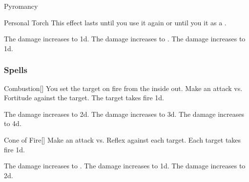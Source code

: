 \begin{spellsection}{Pyromancy}
\begin{freeability}{Personal Torch}
This effect lasts until you use it again or until you  it as a .

\rankline
{} The damage increases to  \minus1d.
 The damage increases to .
 The damage increases to  \plus1d.
\end{freeability}

\end{spellsection}


\subsubsection{Spells}


\lowercase{\hypertarget{spell:Combustion}{}}\label{spell:Combustion}
\begin{freeability}[Rank 1]{\hypertarget{spell:Combustion}{Combustion}}[]
You set the target on fire from the inside out.
Make an attack vs. Fortitude against the target.
\hit The target takes fire  \plus1d.

\rankline
{} The damage increases to  \plus2d.
 The damage increases to  \plus3d.
 The damage increases to  \plus4d.

\end{freeability}
\vspace{0.25em}



\lowercase{\hypertarget{spell:Cone of Fire}{}}\label{spell:Cone of Fire}
\begin{freeability}[Rank 1]{\hypertarget{spell:Cone of Fire}{Cone of Fire}}[]
Make an attack vs. Reflex against each target.
\hit Each target takes fire  \minus1d.

\rankline
{} The damage increases to .
 The damage increases to  \plus1d.
 The damage increases to  \plus2d.

\end{freeability}
\vspace{0.25em}



